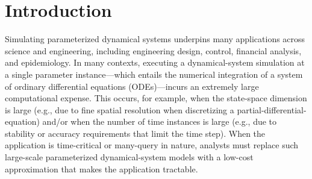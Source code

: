 \documentclass[3p,computermodern,10pt]{elsarticle}
\begin{document}
\begin{frontmatter}
\begin{abstract}

\end{abstract}
\end{frontmatter}


\section{Introduction}

Simulating parameterized dynamical systems underpins many applications across
science and engineering, including engineering design, control, financial
analysis, and epidemiology. In many contexts, executing a dynamical-system
simulation at a single parameter instance---which entails the numerical
integration of a system of ordinary differential equations (ODEs)---incurs an
extremely large computational expense.  This occurs, for example, when the
state-space dimension is large (e.g., due to fine spatial resolution when
discretizing a partial-differential-equation) and/or when the number
of time instances is large (e.g., due to stability or accuracy requirements
that limit the time step).  When the application is time-critical or
many-query in nature, analysts must replace such large-scale parameterized
dynamical-system models with a low-cost approximation that makes the
application tractable.
\end{document}
